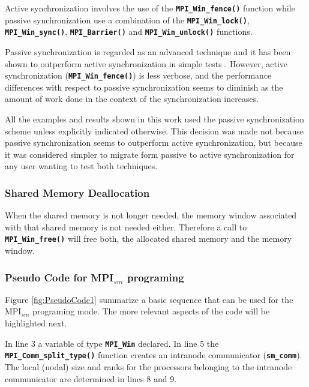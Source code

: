 Active synchronization involves the use of the \textbf{\texttt{MPI\_Win\_fence()}} function while passive synchronization use a combination of the \textbf{\texttt{MPI\_Win\_lock()}}, \textbf{\texttt{MPI\_Win\_sync()}},  \textbf{\texttt{MPI\_Barrier()}} and \textbf{\texttt{MPI\_Win\_unlock()}} functions. 

\medskip

Passive synchronization is regarded as an advanced technique and it has been shown to outperform active synchronization in simple tests\cite{Samfass_2016} \cite{brinskiy2015}. However, active synchronization (\textbf{\texttt{MPI\_Win\_fence()}}) is less verbose, and the performance differences with respect to passive synchronization seems to diminish as the amount of work done in the context of the synchronization increases.

\medskip

All the examples and results shown in this work used the passive synchronization scheme unless explicitly indicated otherwise. This decision was made not because passive synchronization seems to outperform active synchronization, but because it was considered simpler to migrate form passive to active synchronization for any user wanting to test both techniques.

\subsubsection*{Shared Memory Deallocation}
When the shared memory is not longer needed, the memory window associated with that shared memory is not needed either. Therefore a call to \textbf{\texttt{MPI\_Win\_free()}} will free both, the allocated shared memory and the memory window.


\subsubsection*{Pseudo Code for MPI$_{sm}$ programing}

Figure \ref{fig:PseudoCode1} summarize a basic sequence that can be used for the MPI$_{sm}$ programing mode. The more relevant aspects of the code will be highlighted next.

\medskip

In line 3 a variable of type \textbf{\texttt{MPI\_Win}} declared. In line 5 the \textbf{\texttt{MPI\_Comm\_split\_type()}} function creates an intranode communicator (\textbf{\texttt{sm\_comm}}). The local (nodal) size and ranks for the processors belonging to the intranode communicator are determined in lines 8 and 9.

